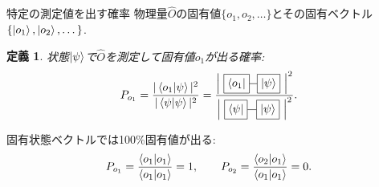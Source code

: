 \documentclass[dvipdfm]{beamer}
\newtheorem*{defn}{定義}
\begin{document}
\begin{frame}{特定の測定値を出す確率}
    物理量$\hat{O}$の固有値$\{o_1,o_2,\dots\}$とその固有ベクトル$\{\ket{o_1}, \ket{o_2}, \dots\}$.
    \begin{defn}
        状態$\ket{\psi}$で$\hat{O}$を測定して固有値$o_1$が出る確率:
        \begin{equation*}
            P_{o_1}=\frac{|\braket{o_1}{\psi}|^2}{|\braket{\psi}|^2}
            =
            \frac{
                \qty|
                    \vcenter{\hbox{
                        \begin{tikzpicture}
                            \node at(0,0)[draw,rectangle](o){$\bra{o_1}$};
                            \node at(1,0)[draw,rectangle](psi){$\ket{\psi}$};
                            \draw(o.east)--(psi.west);
                        \end{tikzpicture}
                    }}
                |^2
            }{
                \qty|
                    \vcenter{\hbox{
                        \begin{tikzpicture}
                            \node at(0,0)[draw,rectangle](o){$\bra{\psi}$};
                            \node at(1,0)[draw,rectangle](psi){$\ket{\psi}$};
                            \draw(o.east)--(psi.west);
                        \end{tikzpicture}
                    }}
                |^2
            }.
        \end{equation*}
    \end{defn}
    固有状態ベクトルでは100\%固有値が出る:
    \begin{equation*}
        P_{o_1}=\frac{\braket{o_1}}{\braket{o_1}}=1,
        \qquad
        P_{o_2}=\frac{\braket{o_2}{o_1}}{\braket{o_1}}=0.
    \end{equation*}
\end{frame}
\end{document}
